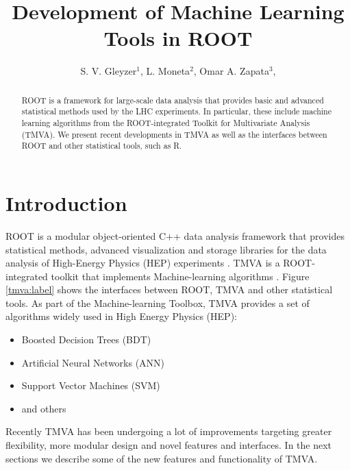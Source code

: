 \documentclass[a4paper]{jpconf}
\begin{document}
\title{Development of Machine Learning Tools in ROOT}

\author{S. V. Gleyzer$^1$, L. Moneta$^2$, Omar A. Zapata$^3$, }




\address{$^1$ University of Florida}

\address{$^2$ CERN}

\address{$^3$ University of Antioquia and Metropolitan Institute of Technology}






\begin{abstract}
ROOT is a framework for large-scale data analysis that provides basic and advanced statistical methods used by the LHC experiments. In particular, these include machine learning algorithms from the ROOT-integrated Toolkit for Multivariate Analysis (TMVA). We present recent developments in TMVA as well as the interfaces between ROOT and other statistical tools, such as R.
\end{abstract}



\section{Introduction}
ROOT is a modular object-oriented C++ data analysis framework that provides statistical methods, advanced visualization and storage libraries for the data analysis of High-Energy Physics (HEP) experiments \cite{Antcheva20092499}. TMVA is a ROOT-integrated toolkit that implements Machine-learning algorithms \cite{Hocker:2007ht}. Figure \ref{tmva:label} shows the interfaces between ROOT, TMVA and other statistical tools. As part of the Machine-learning Toolbox, TMVA provides a set of algorithms widely used in High Energy Physics (HEP):

\begin{itemize}  
\item Boosted Decision Trees (BDT)
\item Artificial Neural Networks (ANN)
\item Support Vector Machines (SVM)
\item and others
\end{itemize}
Recently TMVA has  been undergoing a lot of improvements targeting  greater flexibility, more modular design and novel features and interfaces. In the next sections we describe some of the new features and functionality of TMVA.
\end{document}
